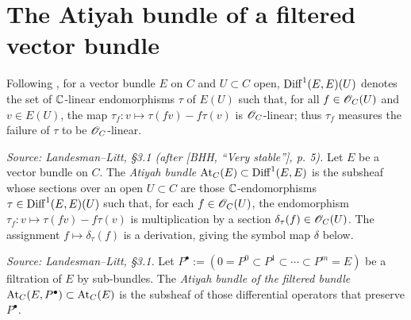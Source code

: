 \section{The Atiyah bundle of a filtered vector bundle}
\label{sec:deformation-atiyah}

Following \cite[16.8.1]{EGAIV.4}, for a vector bundle $E$ on $C$ and $U \subset C$
open, $\operatorname{Diff}^1(E,E)(U)$ denotes the set of $\mathbb{C}$-linear endomorphisms $\tau$ of
$E(U)$ such that, for all $f \in \mathscr{O}_C(U)$ and $v \in E(U)$, the map
$\tau_f: v \mapsto \tau(fv) - f\tau(v)$ is $\mathscr{O}_C$-linear; thus $\tau_f$ measures
the failure of $\tau$ to be $\mathscr{O}_C$-linear.

\begin{definition}
  \label{def:atiyah}
  \textit{Source: Landesman--Litt, \S3.1 (after [BHH, ``Very stable''], p. 5).}
  Let $E$ be a vector bundle on $C$. The \emph{Atiyah bundle}
  $\operatorname{At}_C(E) \subset \operatorname{Diff}^1(E,E)$ is the subsheaf whose sections over an
  open $U \subset C$ are those $\mathbb{C}$-endomorphisms $\tau \in \operatorname{Diff}^1(E,E)(U)$
  such that, for each $f \in \mathscr{O}_C(U)$, the endomorphism
  $\tau_f: v \mapsto \tau(fv) - f\tau(v)$ is multiplication by a section
  $\delta_\tau(f) \in \mathscr{O}_C(U)$. The assignment $f \mapsto \delta_\tau(f)$ is a
  derivation, giving the symbol map $\delta$ below.
\end{definition}

\begin{definition}
  \label{def:atiyah-filtered}
  \textit{Source: Landesman--Litt, \S3.1.}
  Let $P^\bullet := (0 = P^0 \subset P^1 \subset \cdots \subset P^m = E)$ be a
  filtration of $E$ by sub-bundles. The \emph{Atiyah bundle of the filtered
  bundle} $\operatorname{At}_C(E,P^\bullet) \subset \operatorname{At}_C(E)$ is the subsheaf of those
  differential operators that preserve $P^\bullet$.
\end{definition}

